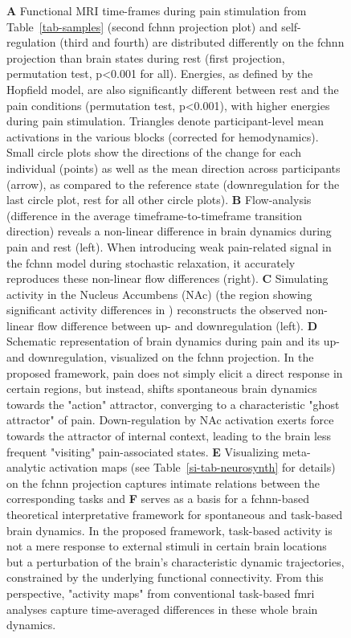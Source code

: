 \documentclass{article}
\begin{document}
\begin{figure}[!htbp]
{\textbf{A} Functional MRI time-frames during pain stimulation from Table~\ref{tab-samples} (second \acrshort{fchnn} projection plot)
and self-regulation (third and fourth) are distributed differently on the \acrshort{fchnn} projection than brain states
during rest (first projection, permutation test, p\textless 0.001 for all). Energies, as defined by the Hopfield model, are also
significantly different between rest and the pain conditions (permutation test, p\textless 0.001), with higher energies during
pain stimulation. Triangles denote participant-level mean activations in the various blocks (corrected for
hemodynamics). Small circle plots show the directions of the change for each individual (points) as well as the mean direction
across participants (arrow), as compared to the reference state (downregulation for the last circle plot, rest for all
other circle plots).
\textbf{B} Flow-analysis (difference in the average timeframe-to-timeframe transition direction) reveals a non-linear difference in brain dynamics during pain and rest (left). When introducing weak pain-related signal in the \acrshort{fchnn} model during stochastic relaxation, it accurately reproduces these non-linear flow differences (right).
\textbf{C} Simulating activity in the Nucleus Accumbens (NAc) (the region showing significant activity differences in \cite{woo2015distinct}) reconstructs the observed non-linear flow difference between up- and downregulation (left).
\textbf{D} Schematic representation of brain dynamics during pain and its up- and downregulation, visualized on the \acrshort{fchnn}  projection. In the proposed framework, pain does not simply elicit a direct response in certain regions, but instead, shifts spontaneous brain dynamics towards the "action" attractor, converging to a characteristic "ghost attractor" of pain. Down-regulation by NAc activation exerts force towards the attractor of internal context, leading to the brain less frequent "visiting" pain-associated states.
\textbf{E} Visualizing meta-analytic activation maps (see Table~\ref{si-tab-neurosynth} for details) on the \acrshort{fchnn} projection captures intimate relations between the corresponding tasks and \textbf{F} serves as a basis for a \acrshort{fchnn}-based theoretical interpretative framework for spontaneous and task-based brain dynamics. In the proposed framework, task-based activity is not a mere response to external stimuli in certain brain locations but a perturbation of the brain's characteristic dynamic trajectories, constrained by the underlying functional connectivity. From this perspective, "activity maps" from conventional task-based \acrshort{fmri} analyses capture time-averaged differences in these whole brain dynamics.}
\label{task-validity}
\end{figure}
\end{document}
